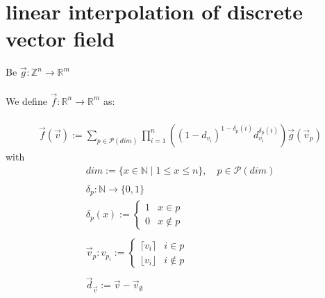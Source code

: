 \documentclass[a4paper]{article}
\begin{document}
\section{linear interpolation of discrete vector field}
Be $\vec{g}:\mathbb{Z}^n\rightarrow\mathbb{R}^m$\\\\
We define $\vec{f}:\mathbb{R}^n\rightarrow\mathbb{R}^m$ as:\\\\
\begin{align*}
  \vec{f}(\vec{v}):=\sum_{p\in\mathcal{P}(dim)}^{}\prod_{i=1}^{n}\left((1-d_{v_i})^{1-\delta_p(i)}d_{v_i}^{\delta_p(i)}\right)\vec{g}(\vec{v}_p)
\end{align*}
with
\begin{align*}
  dim:=\{x\in\mathbb{N} \mid 1\leq x\leq n\},\quad p\in\mathcal{P}(dim)\\\\
  \delta_p:\mathbb{N}\rightarrow\{0,1\}\\
  \delta_p(x):=
  \begin{cases}
    1&x\in p\\
    0&x\not\in p
  \end{cases}\\\\
  \vec{v}_p:v_{p_i}:=
  \begin{cases}
    \lceil v_i\rceil&i\in p\\
    \lfloor v_i\rfloor&i\not\in p
  \end{cases}\\\\
  \vec{d}_{\vec{v}}:=\vec{v}-\vec{v}_{\emptyset}
\end{align*}
\end{document}
